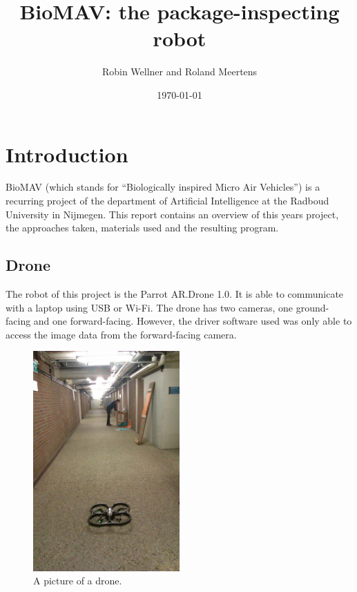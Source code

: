 \documentclass[a4paper,10pt]{article}
\begin{document}
\title{BioMAV: the package-inspecting robot}

\author{Robin Wellner and Roland Meertens}

\date{\today}

\maketitle

\section{Introduction}
BioMAV (which stands for ``Biologically inspired Micro Air Vehicles'') is a recurring project of the department of Artificial
Intelligence at the Radboud University in Nijmegen.
This report contains an overview of this years project, the approaches taken, materials used and the resulting program. 


\subsection{Drone}
The robot of this project is the Parrot AR.Drone 1.0. It is able to
communicate with a laptop using USB or Wi-Fi. The drone has two cameras, one
ground-facing and one forward-facing. However, the driver software used was only able to access the image data from the forward-facing camera.

\begin{figure}[h!]
	\caption{A picture of a drone.}
	\centering
	\includegraphics[width=0.5\textwidth]{images/boringHallway}
\end{figure}
\end{document}
